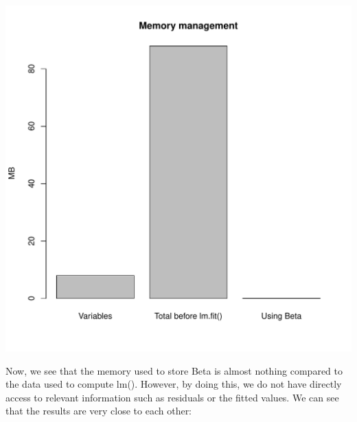 \documentclass{llncs}\usepackage[]{graphicx}\usepackage[]{color}
\makeatletter
\def\maxwidth{ %
  \ifdim\Gin@nat@width>\linewidth
    \linewidth
  \else
    \Gin@nat@width
  \fi
}
\newenvironment{knitrout}{}{} %
\makeatother
\begin{document}
\begin{knitrout}
\includegraphics[width=\maxwidth]{figure/unnamed-chunk-23-2} 

\end{knitrout}
\noindent
Now, we see that the memory used to store Beta is almost nothing compared to the data used to compute lm(). However, by doing this, we do not have directly access to relevant information such as residuals or the fitted values. We can see that the results are very close to each other:
\end{document}
